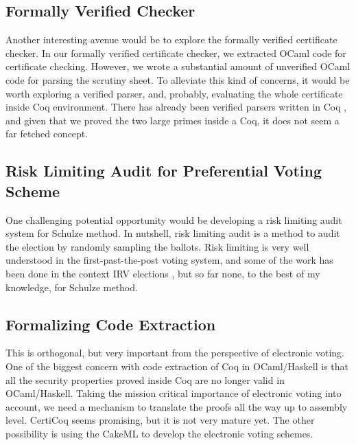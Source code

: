 \subsection{Formally Verified Checker}
Another interesting avenue would be to explore
the formally verified certificate checker.  In our formally verified 
certificate checker, we extracted OCaml code for certificate checking. 
However, we wrote a substantial amount of unverified OCaml code 
for parsing the scrutiny sheet. To alleviate this kind of concerns, 
it would be worth exploring a verified parser, and, probably, 
evaluating the whole certificate inside Coq environment. 
There has already been verified parsers written in 
Coq \citep{10.1007/978-3-642-28869-2_20}, 
and given that we proved the two large primes inside a Coq, 
it does not seem a far fetched concept. 

\subsection{Risk Limiting Audit for Preferential Voting Scheme}
One challenging potential opportunity would be developing 
a risk limiting audit system for Schulze method. In nutshell, 
risk limiting audit is a method to audit the election by 
randomly sampling the ballots. Risk limiting is very well 
understood in the first-past-the-post voting system, 
and some of the work has been done in the context 
IRV elections \citep{10.1007/978-3-030-00419-4_2},
but so far none, to the best of my knowledge, 
for Schulze method.

\subsection{Formalizing Code Extraction}
This is orthogonal, but very important from the perspective of 
electronic voting.  One of the biggest concern with code extraction of Coq in OCaml/Haskell 
is that all the security properties proved inside Coq are no longer valid 
in OCaml/Haskell. Taking the mission critical importance of electronic voting into account, 
we need a mechanism to translate the proofs all the way up to assembly level. 
CertiCoq \citep{anand2017certicoq} seems promising, but it is not very mature yet. The other possibility is 
using the CakeML \citep{Kumar:2014:CVI} to develop the electronic voting  
schemes. 




